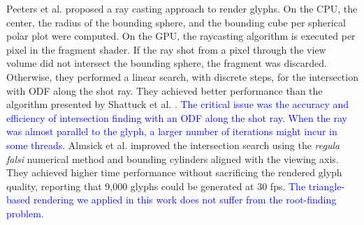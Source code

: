 \documentclass[twoside,twocolumn,10pt]{article}
\begin{document}



Peeters et al. \cite{peeters2009} proposed a ray casting approach to render glyphs. On the CPU, the center, the radius of the bounding sphere, and the bounding cube per spherical polar plot were computed. On the GPU, the raycasting algorithm is executed per pixel in the fragment shader. If the ray shot from a pixel through the view volume did not intersect the bounding sphere, the fragment was discarded. Otherwise, they performed a linear search, with discrete steps, for the intersection with ODF along the shot ray. They achieved better performance than the algorithm presented by Shattuck et al. \cite{shattuck2008}.  \textcolor{blue}{The critical issue was the accuracy and efficiency of intersection finding with an ODF along the shot ray. When the ray was almost parallel to the glyph, a larger number of iterations might incur in some threads.} Almsick et al. \cite{almsick2011} improved the intersection search using the \textit{regula falsi} numerical method and bounding cylinders aligned with the viewing axis. They achieved higher time performance without sacrificing the rendered glyph quality, reporting that 9,000 glyphs could be generated at 30 fps.  \textcolor{blue}{The triangle-based rendering we applied in this work does not suffer from the root-finding problem.} 



\label{ssec:superquadric_rendering}
\end{document}
